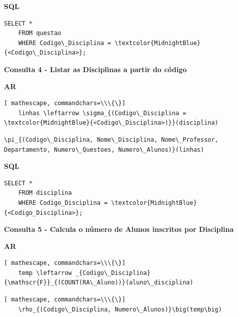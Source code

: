 \documentclass[12pt,a4paper]{article}
\begin{document}
\begin{center}
    \textbf{SQL}
\end{center}
\begin{Verbatim}[commandchars=\\\{\}]
    SELECT * 
    FROM questao 
    WHERE Codigo\_Disciplina = \textcolor{MidnightBlue}{<Codigo\_Disciplina>};
\end{Verbatim}

\vspace{0.5cm}
\begin{center}
    \textbf{Consulta 4 - Listar as Disciplinas a partir do código }
\end{center}
\begin{center}
    \textbf{AR}
\end{center}

\begin{Verbatim}[ mathescape, commandchars=\\\{\}]
    linhas \leftarrow \sigma_{(Codigo\_Disciplina = \textcolor{MidnightBlue}{<Codigo\_Disciplina>)}}(disciplina)     
\end{Verbatim}

\begin{Verbatim}[mathescape, commandchars=\\\{\}]
    \pi_{(Codigo\_Disciplina, Nome\_Disciplina, Nome\_Professor, Departamento, Numero\_Questoes, Numero\_Alunos)}(linhas)
\end{Verbatim}

\begin{center}
    \textbf{SQL}
\end{center}
\begin{Verbatim}[commandchars=\\\{\}]
    SELECT * 
    FROM disciplina 
    WHERE Codigo_Disciplina = \textcolor{MidnightBlue}{<Codigo_Disciplina>};
\end{Verbatim}

\vspace{0.5cm}
\begin{center}
    \textbf{Consulta 5 - Calcula o número de Alunos inscritos por Disciplina}
\end{center}
\begin{center}
    \textbf{AR}
\end{center}
\begin{Verbatim}[ mathescape, commandchars=\\\{\}]
    temp \leftarrow _{Codigo\_Disciplina}{\mathscr{F}}_{(COUNT(RA\_Aluno))}(aluno\_disciplina)
\end{Verbatim}
\begin{Verbatim}[ mathescape, commandchars=\\\{\}]
    \rho_{(Codigo\_Disciplina, Numero\_Alunos)}\big(temp\big)
\end{Verbatim}
\end{document}
